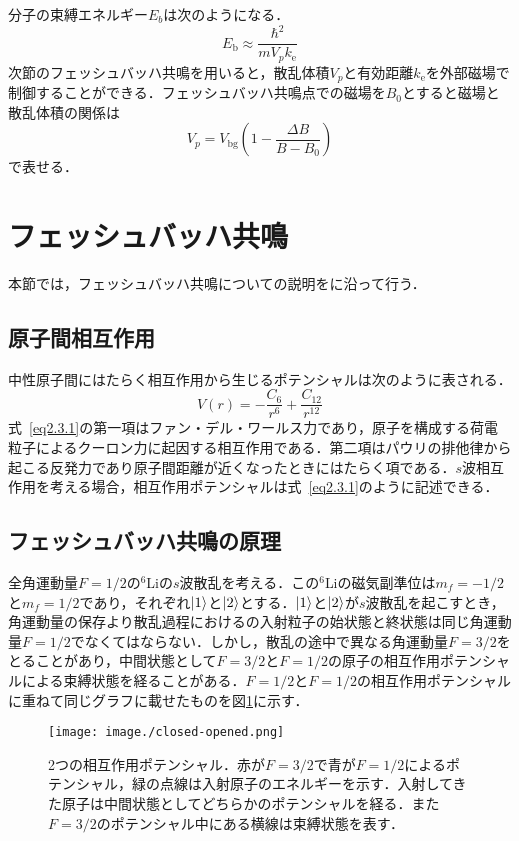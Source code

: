 \documentclass[11pt,a4j,notitlepage]{jreport}
\newcommand{\eq}[1]{式~\eqref{#1}}	%
\begin{document}
分子の束縛エネルギー$E_b$は次のようになる\cite{InaD}．
\begin{equation}
	E_{\mathrm{b}} \approx \frac{\hbar^{2}}{m V_p k_{\mathrm e}}
	\label{eq2.2.22}
\end{equation}
次節のフェッシュバッハ共鳴を用いると，散乱体積$V_p$と有効距離$k_{\mathrm e}$を外部磁場で制御することができる．フェッシュバッハ共鳴点での磁場を$B_{0}$とすると磁場と散乱体積の関係は
\begin{equation}
	V_p = V_{\mathrm{bg}}\left(1-\frac{\Delta B}{B-B_{0}}\right)
	\label{eq2.2.23}
\end{equation}
で表せる．

\section{フェッシュバッハ共鳴}
本節では，フェッシュバッハ共鳴についての説明を\cite{Miyato}に沿って行う．

\subsection{原子間相互作用}
中性原子間にはたらく相互作用から生じるポテンシャルは次のように表される．
\begin{equation}
	V(r) = - \frac{C_6}{r^6} + \frac{C_{12}}{r^{12}}
	\label{eq2.3.1}
\end{equation}
\eq{eq2.3.1}の第一項はファン・デル・ワールス力であり，原子を構成する荷電粒子によるクーロン力に起因する相互作用である．第二項はパウリの排他律から起こる反発力であり原子間距離が近くなったときにはたらく項である．$s$波相互作用を考える場合，相互作用ポテンシャルは\eq{eq2.3.1}のように記述できる．

\subsection{フェッシュバッハ共鳴の原理}
全角運動量$F=1/2$の$^6$Liの$s$波散乱を考える．この$^6$Liの磁気副準位は$m_f=-1/2$と$m_f=1/2$であり，それぞれ$\ket{1}$と$\ket{2}$とする．$\ket{1}$と$\ket{2}$が$s$波散乱を起こすとき，角運動量の保存より散乱過程におけるの入射粒子の始状態と終状態は同じ角運動量$F=1/2$でなくてはならない．しかし，散乱の途中で異なる角運動量$F=3/2$をとることがあり，中間状態として$F=3/2$と$F=1/2$の原子の相互作用ポテンシャルによる束縛状態を経ることがある．$F=1/2$と$F=1/2$の相互作用ポテンシャルに重ねて同じグラフに載せたものを図\ref{fig2.3.1}に示す．
\begin{figure}[h]
	\centering
		\texttt{[image: image./closed-opened.png]}
	\caption{2つの相互作用ポテンシャル．赤が$F=3/2$で青が$F=1/2$によるポテンシャル，緑の点線は入射原子のエネルギーを示す．入射してきた原子は中間状態としてどちらかのポテンシャルを経る．また$F=3/2$のポテンシャル中にある横線は束縛状態を表す．}
	\label{fig2.3.1}
\end{figure}
\end{document}
